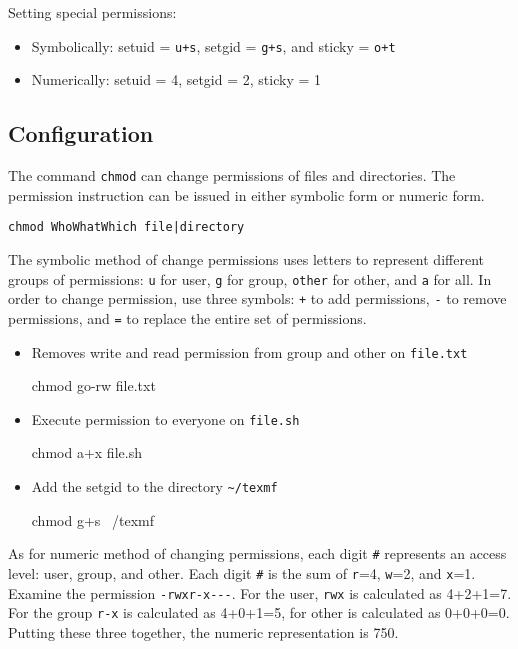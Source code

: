 Setting special permissions:

\begin{itemize}
\item Symbolically: setuid = \verb|u+s|, setgid = \verb|g+s|, and sticky = \verb|o+t|
\item Numerically: setuid = 4, setgid = 2, sticky = 1
\end{itemize}

\subsection{Configuration}

The command \verb|chmod| can change permissions of files and directories. The permission instruction can be issued in either symbolic form or numeric form.\\

\begin{verbatim}
chmod WhoWhatWhich file|directory
\end{verbatim}

The symbolic method of change permissions uses letters to represent different groups of permissions: \verb|u| for user, \verb|g| for group, \verb|other| for other, and \verb|a| for all. In order to change permission, use three symbols: \verb|+| to add permissions, \verb|-| to remove permissions, and \verb|=| to replace the entire set of permissions. 

\begin{itemize}
\item Removes write and read permission from group and other on \verb|file.txt|

\begin{commandshell}
chmod go-rw file.txt
\end{commandshell}

\item Execute permission to everyone on \verb|file.sh|

\begin{commandshell}
chmod a+x file.sh
\end{commandshell}

\item Add the setgid to the directory \verb|~/texmf|
\begin{commandshell}
chmod g+s ~/texmf
\end{commandshell}
\end{itemize}

As for numeric method of changing permissions, each digit \verb|#| represents an access level: user, group, and other. Each digit \verb|#| is the sum of \verb|r|=4, \verb|w|=2, and \verb|x|=1. Examine the permission \verb|-rwxr-x---|. For the user, \verb|rwx| is calculated as 4+2+1=7. For the group \verb|r-x| is calculated as 4+0+1=5, for other is calculated as 0+0+0=0. Putting these three together, the numeric representation is 750.

